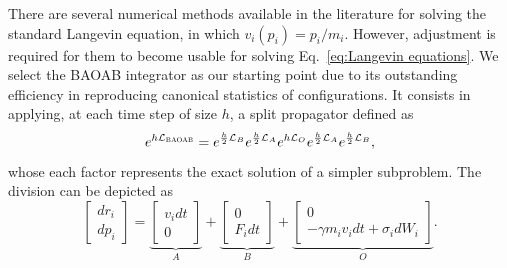 \documentclass[
aip,
jcp,
reprint,
]{revtex4-1}
\newcommand{\timestep}{h}
\begin{document}
There are several numerical methods available in the literature for solving the standard Langevin equation, in which $v_i(p_i) = p_i/m_i$.
However, adjustment is required for them to become usable for solving Eq.~\eqref{eq:Langevin equations}.
We select the BAOAB integrator \cite{Leimkuhler_2012, Leimkuhler_2013_2} as our starting point due to its outstanding efficiency in reproducing canonical statistics of configurations.
It consists in applying, at each time step of size $\timestep$, a split propagator defined as
\begin{equation}
e^{\timestep \mathcal{L}_\textsc{BAOAB}} =
e^{\frac{\timestep}{2} \mathcal{L}_B}
e^{\frac{\timestep}{2} \mathcal{L}_A}
e^{\timestep \mathcal{L}_O}
e^{\frac{\timestep}{2} \mathcal{L}_A}
e^{\frac{\timestep}{2} \mathcal{L}_B},
\end{equation}
whose each factor represents the exact solution of a simpler subproblem.
The division can be depicted \cite{Leimkuhler_2015} as
\begin{equation}
\left[\begin{array}{c}
dr_i \\ dp_i
\end{array}\right] =
\underbrace{\left[\begin{array}{c}
v_i dt \\ 0
\end{array}\right]}_A + 
\underbrace{\left[\begin{array}{c}
0 \\ F_i dt
\end{array}\right]}_B +
\underbrace{\left[\begin{array}{c}
0 \\ -\gamma m_i v_i dt + \sigma_i dW_i
\end{array}\right]}_O.
\end{equation}
\end{document}
